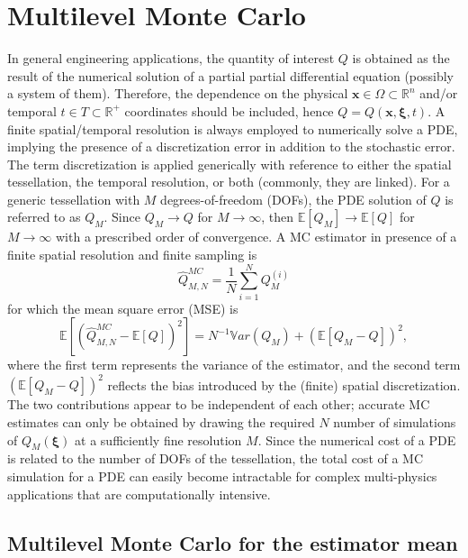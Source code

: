 \section{Multilevel Monte Carlo} \label{uq:sampling:multilevel}
In general engineering applications, the quantity of interest $Q$
is obtained as the result of the numerical solution of a partial partial differential equation (possibly a system of them).  Therefore, the dependence on the 
physical $\mathbf{x} \in \Omega\subset\mathbb{R}^n$ and/or temporal $t \in T\subset\mathbb{R^+}$ coordinates should be included, 
hence $Q=Q(\mathbf{x}, \boldsymbol{\xi}, t)$. A finite spatial/temporal resolution is always employed to numerically solve a PDE, implying
the presence of a discretization error in addition to the stochastic error. The term discretization is applied generically with reference 
to either the spatial tessellation, the temporal resolution, or both (commonly, they are linked). For a generic tessellation with $M$ 
degrees-of-freedom (DOFs), the PDE solution of $Q$ is referred to as $Q_M$. Since $Q_M \rightarrow Q$ for $M\rightarrow\infty$, 
then $\mathbb{E}\left[{Q_M}\right] \rightarrow \mathbb{E}\left[{Q}\right]$ for $M\rightarrow\infty$ with a prescribed order of convergence. 
A MC estimator in presence of a finite spatial resolution and finite sampling is
\begin{equation}
\hat{Q}^{MC}_{M,N} = \frac{1}{N} \sum_{i=1}^N Q_M^{(i)}
\end{equation}
for which the mean square error (MSE) is
\begin{equation}
\mathbb{E}\left[ (\hat{Q}^{MC}_{M,N}-\mathbb{E}\left[ Q \right] )^2 \right]
       = N^{-1} \mathbb{V}ar\left({Q_M}\right) + \left( \mathbb{E}\left[{ Q_M-Q }\right] \right)^2,
\end{equation}
where the first term represents the variance of the estimator, and the second term $\left( \mathbb{E}\left[ Q_M-Q \right] \right)^2$ reflects the bias
introduced by the (finite) spatial discretization. The two contributions appear to be independent of each other; accurate MC estimates can only be obtained by drawing the required $N$ number of simulations of $Q_M( \boldsymbol{\xi} )$ at 
a sufficiently fine resolution $M$. Since the numerical cost of a PDE is related to the number of DOFs of the tessellation,
the total cost of a MC simulation for a PDE can easily become intractable for complex multi-physics applications that are computationally 
intensive.

\subsection{Multilevel Monte Carlo for the estimator mean}

